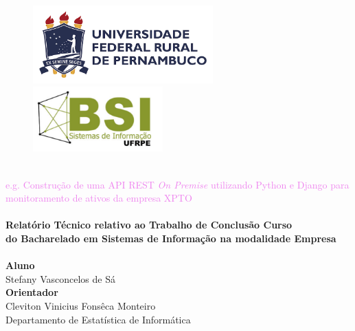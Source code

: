 \begin{titlepage}
\begin{center}


\begin{figure}[ht]
		\includegraphics[height=3cm]{images/logo_ufrpe_horizontal.png}
		\hspace{3.5cm}
    	\includegraphics[height=2.5cm]{images/logo_bsi .pdf}
	\end{figure}   

\vspace{1cm}

\textsc{} \\
\small \textcolor{violet}{e.g. Construção de uma API REST \textit{On Premise} utilizando Python e Django para monitoramento de ativos da empresa XPTO}\\[2cm]

\HRule \\[0.4cm]
{\large \bfseries Relatório Técnico relativo ao Trabalho de Conclusão Curso \\
do Bacharelado em Sistemas de Informação na modalidade Empresa \\[0.4cm]}
\HRule 
\\[2cm]

\large\textbf{Aluno}\\
Stefany Vasconcelos de Sá\\[1cm]

\large\textbf{Orientador}\\
Cleviton Vinicius Fonsêca Monteiro\\
Departamento de Estatística de Informática\\[1cm]





\end{center}
\end{titlepage}
